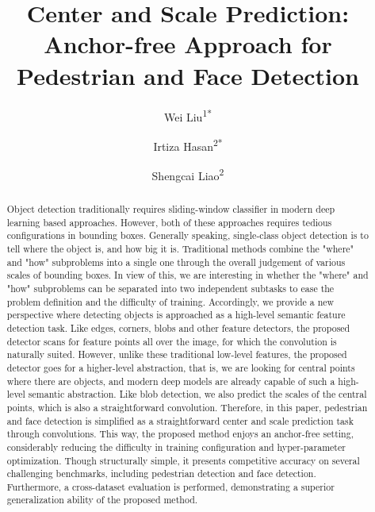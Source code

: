 \documentclass[review]{elsarticle}
\begin{document}
\newcommand{\tabincell}[2]{
\begin{tabular}{@{}#1@{}}#2\end{tabular}
}

\begin{frontmatter}

\title{Center and Scale Prediction: Anchor-free Approach for Pedestrian and Face Detection}




\author{Wei Liu\textsuperscript{1*}}
\author{Irtiza Hasan\textsuperscript{2*}}
\author{Shengcai Liao\textsuperscript{2}}




\address{National University of Defense Technology, Changsha, China \textsuperscript{1}}
\address{liuwei16@nudt.edu.cn}
\address{Inception Institute of Artificial Intelligence (IIAI), UAE \textsuperscript{2}}
\address{\{irtiza.hasan,shengcai.liao\}@inceptioniai.org}

\begin{abstract}
Object detection traditionally requires sliding-window classifier in modern deep learning based approaches. However, both of these approaches requires tedious configurations in bounding boxes. Generally speaking, single-class object detection is to tell where the object is, and how big it is. Traditional methods combine the "where" and "how" subproblems into a single one through the overall judgement of various scales of bounding boxes. In view of this, we are interesting in whether the "where" and "how" subproblems can be separated into two independent subtasks to ease the problem definition and the difficulty of training. Accordingly, we provide a new perspective where detecting objects is approached as a high-level semantic feature detection task. Like edges, corners, blobs and other feature detectors, the proposed detector scans for feature points all over the image, for which the convolution is naturally suited. However, unlike these traditional low-level features, the proposed detector goes for a higher-level abstraction, that is, we are looking for central points where there are objects, and modern deep models are already capable of such a high-level semantic abstraction. Like blob detection, we also predict the scales of the central points, which is also a straightforward convolution. Therefore, in this paper, pedestrian and face detection is simplified as a straightforward center and scale prediction task through convolutions. This way, the proposed method enjoys an anchor-free setting, considerably reducing the difficulty in training configuration and hyper-parameter optimization. Though structurally simple, it presents competitive accuracy on several challenging benchmarks, including pedestrian detection and face detection. Furthermore, a cross-dataset evaluation is performed, demonstrating a superior generalization ability of the proposed method.
\end{abstract}


\end{frontmatter}
\end{document}
